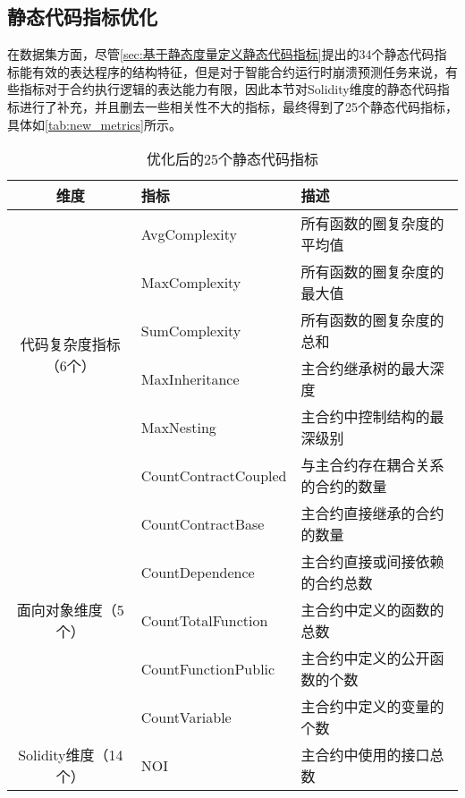 \subsection{静态代码指标优化}
在数据集方面，尽管\autoref{sec:基于静态度量定义静态代码指标}提出的34个静态代码指标能有效的表达程序的结构特征，但是对于智能合约运行时崩溃预测任务来说，有些指标对于合约执行逻辑的表达能力有限，因此本节对Solidity维度的静态代码指标进行了补充，并且删去一些相关性不大的指标，最终得到了25个静态代码指标，具体如\autoref{tab:new_metrics}所示。
\begin{table}[htbp]
    \caption{\label{tab:new_metrics}优化后的25个静态代码指标}
    \small
            \renewcommand{\arraystretch}{1.5}
        \begin{tabularx}{\linewidth}{cp{3.5cm}<{\centering}X<{\raggedright}}
            \hline
            \textbf{维度}            & \textbf{指标}              & \textbf{描述} \\ \hline
            \multirow{6}{*}{代码复杂度指标（6个）} & AvgComplexity        & 所有函数的圈复杂度的平均值 \\
                                       & MaxComplexity        & 所有函数的圈复杂度的最大值 \\
                                       & SumComplexity        & 所有函数的圈复杂度的总和 \\
                                       & MaxInheritance   & 主合约继承树的最大深度 \\
                                       & MaxNesting           & 主合约中控制结构的最深级别 \\
                                       & CountContractCoupled  & 与主合约存在耦合关系的合约的数量 \\ \hline
            \multirow{5}{*}{面向对象维度（5个）} & CountContractBase    &  主合约直接继承的合约的数量 \\
                                       & CountDependence      & 主合约直接或间接依赖的合约总数 \\
                                       & CountTotalFunction   & 主合约中定义的函数的总数 \\
                                       & CountFunctionPublic  & 主合约中定义的公开函数的个数 \\
                                       & CountVariable        & 主合约中定义的变量的个数 \\ \hline
            \multirow{14}{*}{Solidity维度（14个）} & NOI                 & 主合约中使用的接口总数 \\

\end{tabularx}
\end{table}
